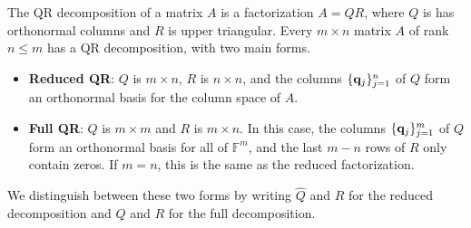 \label{lab:QRdecomp}

The QR decomposition of a matrix $A$ is a factorization $A=QR$, where $Q$ is  has orthonormal columns and $R$ is upper triangular.
Every $m \times n$ matrix $A$ of rank $n \le m$ has a QR decomposition, with two main forms.
%
\begin{itemize}
    \item \textbf{Reduced QR}: $Q$ is $m \times n$, $R$ is $n \times n$, and the columns $\{\mathbf{q}_j\}_{j=1}^n$ of $Q$ form an orthonormal basis for the column space of $A$.
    \item \textbf{Full QR}: $Q$ is $m \times m$ and $R$ is $m \times n$.
    In this case, the columns $\{\mathbf{q}_j\}_{j=1}^m$ of $Q$ form an orthonormal basis for all of $\mathbb{F}^m$, and the last $m - n$ rows of $R$ only contain zeros.
    If $m = n$, this is the same as the reduced factorization.
\end{itemize}
We distinguish between these two forms by writing $\widehat{Q}$ and $\widehat{R}$ for the reduced decomposition and $Q$ and $R$ for the full decomposition.
%
